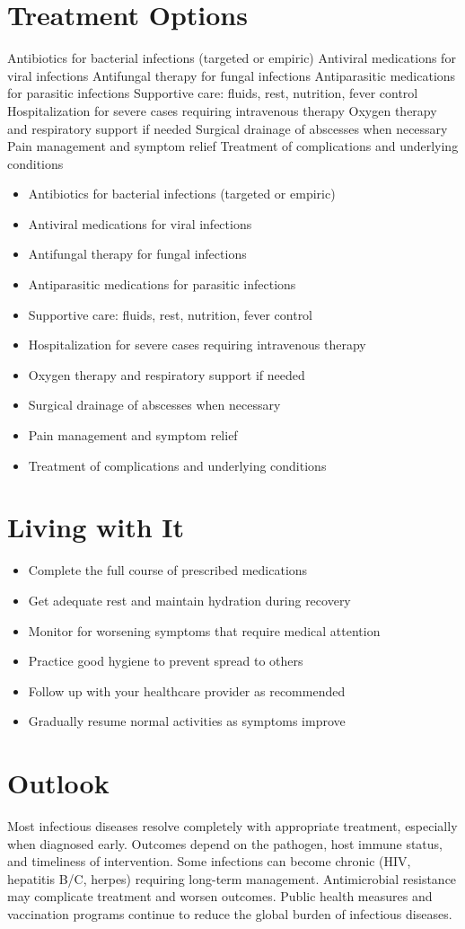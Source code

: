 \section{Treatment Options}
Antibiotics for bacterial infections (targeted or empiric) Antiviral medications for viral infections Antifungal therapy for fungal infections Antiparasitic medications for parasitic infections Supportive care: fluids, rest, nutrition, fever control Hospitalization for severe cases requiring intravenous therapy Oxygen therapy and respiratory support if needed Surgical drainage of abscesses when necessary Pain management and symptom relief Treatment of complications and underlying conditions

\begin{itemize}[noitemsep]
  \item Antibiotics for bacterial infections (targeted or empiric)
  \item Antiviral medications for viral infections
  \item Antifungal therapy for fungal infections
  \item Antiparasitic medications for parasitic infections
  \item Supportive care: fluids, rest, nutrition, fever control
  \item Hospitalization for severe cases requiring intravenous therapy
  \item Oxygen therapy and respiratory support if needed
  \item Surgical drainage of abscesses when necessary
  \item Pain management and symptom relief
  \item Treatment of complications and underlying conditions
\end{itemize}
\section{Living with It}
\begin{itemize}[noitemsep]
  \item Complete the full course of prescribed medications
  \item Get adequate rest and maintain hydration during recovery
  \item Monitor for worsening symptoms that require medical attention
  \item Practice good hygiene to prevent spread to others
  \item Follow up with your healthcare provider as recommended
  \item Gradually resume normal activities as symptoms improve
\end{itemize}
\section{Outlook}
Most infectious diseases resolve completely with appropriate treatment, especially when diagnosed early. Outcomes depend on the pathogen, host immune status, and timeliness of intervention. Some infections can become chronic (HIV, hepatitis B/C, herpes) requiring long-term management. Antimicrobial resistance may complicate treatment and worsen outcomes. Public health measures and vaccination programs continue to reduce the global burden of infectious diseases.
